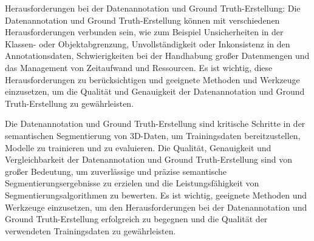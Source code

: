 Herausforderungen bei der Datenannotation und Ground Truth-Erstellung: Die
Datenannotation und Ground Truth-Erstellung können mit verschiedenen
Herausforderungen verbunden sein, wie zum Beispiel Unsicherheiten in der
Klassen- oder Objektabgrenzung, Unvollständigkeit oder Inkonsistenz in den
Annotationsdaten, Schwierigkeiten bei der Handhabung großer Datenmengen und das
Management von Zeitaufwand und Ressourcen. Es ist wichtig, diese
Herausforderungen zu berücksichtigen und geeignete Methoden und Werkzeuge
einzusetzen, um die Qualität und Genauigkeit der Datenannotation und Ground
Truth-Erstellung zu gewährleisten.

Die Datenannotation und Ground Truth-Erstellung sind kritische Schritte in der
semantischen Segmentierung von 3D-Daten, um Trainingsdaten bereitzustellen,
Modelle zu trainieren und zu evaluieren. Die Qualität, Genauigkeit und
Vergleichbarkeit der Datenannotation und Ground Truth-Erstellung sind von
großer Bedeutung, um zuverlässige und präzise semantische
Segmentierungsergebnisse zu erzielen und die Leistungsfähigkeit von
Segmentierungsalgorithmen zu bewerten. Es ist wichtig, geeignete Methoden und
Werkzeuge einzusetzen, um den Herausforderungen bei der Datenannotation und
Ground Truth-Erstellung erfolgreich zu begegnen und die Qualität der
verwendeten Trainingsdaten zu gewährleisten.
